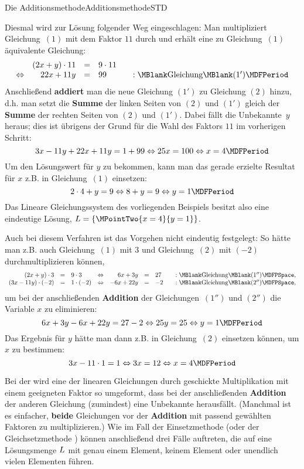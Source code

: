 \begin{MXContent}{Die Additionsmethode}{Additionsmethode}{STD}
\begin{MExample}
Diesmal wird zur Lösung folgender Weg eingeschlagen: Man multipliziert Gleichung~$(1)$ mit dem Faktor $11$ durch und
erhält eine zu Gleichung~$(1)$ äquivalente Gleichung:
$$\begin{array}{crclcl} & (2 x + y) \cdot 11 & = & 9 \cdot 11 & & \\
\Leftrightarrow & 22 x + 11 y & = & 99 & & : \MBlank\mbox{Gleichung}\MBlank (1') 
\MDFPeriod \end{array}$$
Anschließend \textbf{addiert} man die neue Gleichung $(1')$ zu Gleichung $(2)$ hinzu, d.h. man setzt die
\textbf{Summe} der linken Seiten von $(2)$ und $(1')$ gleich der \textbf{Summe} der rechten Seiten
von $(2)$ und $(1')$. Dabei fällt die Unbekannte~$y$
heraus; dies ist übrigens der Grund für die Wahl des Faktors $11$ im vorherigen Schritt:
$$3 x - 11 y + 22 x + 11 y = 1 + 99 \Leftrightarrow 25 x = 100 \Leftrightarrow x = 4 \MDFPeriod $$
Um den Lösungswert für $y$ zu bekommen, kann man das gerade erzielte Resultat für $x$ z.B. in Gleichung~$(1)$
einsetzen:
$$2 \cdot 4 + y = 9 \Leftrightarrow 8 + y = 9 \Leftrightarrow y = 1 \MDFPeriod$$
Das Lineare Gleichungssystem des vorliegenden Beispiels besitzt also eine eindeutige Lösung, ${\ML} =
\{ \MPointTwo{x = 4}{y = 1} \}$.
\end{MExample}
Auch bei diesem Verfahren ist das Vorgehen nicht eindeutig festgelegt: So hätte man z.B. auch Gleichung~$(1)$ mit $3$
und Gleichung~$(2)$ mit $(- 2)$ durchmultiplizieren können,
\[\begin{array}{rclcrclcl} (2x + y) \cdot 3 & = & 9 \cdot 3 & \Leftrightarrow & 6 x + 3 y & = & 27
& & : \MBlank\mbox{Gleichung}\MBlank ({1''}) \MDFPSpace, \\ 
(3 x - 11 y) \cdot (- 2) & = & 1 \cdot (- 2) & \Leftrightarrow & - 6 x + 22 y & = & - 2
& & : \MBlank\mbox{Gleichung}\MBlank ({2''}) \MDFPSpace , \end{array}\]
um bei der anschließenden \textbf{Addition} der Gleichungen~$(1'')$ und $(2'')$ die Variable $x$ zu eliminieren:
$$6 x + 3 y - 6 x + 22 y = 27 - 2 \Leftrightarrow 25 y = 25 \Leftrightarrow y = 1 \MDFPeriod$$
Das Ergebnis für $y$ hätte man dann z.B. in Gleichung~$(2)$ einsetzen können, um $x$ zu bestimmen:
$$3 x - 11 \cdot 1 = 1 \Leftrightarrow 3 x = 12 \Leftrightarrow x = 4 \MDFPeriod$$
\begin{MInfo}
Bei der  wird eine der linearen Gleichungen durch geschickte Multiplikation
mit einem geeigneten Faktor so umgeformt, dass bei der anschließenden \textbf{Addition} der anderen Gleichung (zumindest)
eine Unbekannte herausfällt. (Manchmal ist es einfacher, \textbf{beide} Gleichungen vor der \textbf{Addition} mit
passend gewählten Faktoren zu multiplizieren.) Wie im Fall der Einsetzmethode
 (oder der Gleichsetzmethode ) können%
anschließend drei Fälle auftreten, die auf eine Lösungsmenge $L$ mit genau einem Element, keinem Element oder
unendlich vielen Elementen führen.
\end{MInfo}
\end{MXContent}

